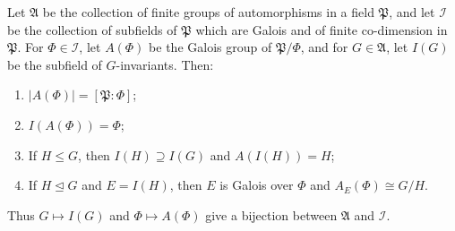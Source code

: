 Let $\mathfrak{A}$ be the collection of finite groups of automorphisms in a field $\mathfrak{P}$, and let $\mathcal{I}$ be the collection of subfields of $\mathfrak{P}$ which are Galois and of finite co-dimension in $\mathfrak{P}$. For $\Phi \in \mathcal{I}$, let $A(\Phi)$ be the Galois group of $\mathfrak{P}/\Phi$, and for $G \in \mathfrak{A}$, let $I(G)$ be the subfield of $G$-invariants. Then:
\begin{enumerate}
\item[(i)] $|A(\Phi)| = [\mathfrak{P}:\Phi]$;
\item[(ii)] $I(A(\Phi)) = \Phi$;
\item[(iii)] If $H \leq G$, then $I(H) \supseteq I(G)$ and $A(I(H)) = H$;
\item[(iv)] If $H \trianglelefteq G$ and $E = I(H)$, then $E$ is Galois over $\Phi$ and $A_E(\Phi) \cong G/H$.
\end{enumerate}
Thus $G \mapsto I(G)$ and $\Phi \mapsto A(\Phi)$ give a bijection between $\mathfrak{A}$ and $\mathcal{I}$.
